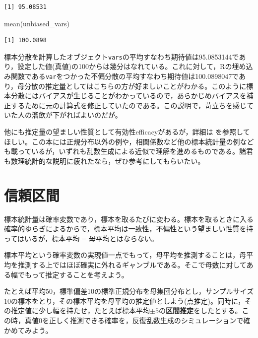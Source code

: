 \documentclass[
  a4paper,
]{ltjsbook}
\newenvironment{Shaded}{\begin{snugshade}}{\end{snugshade}}
\newcommand{\FunctionTok}[1]{\textcolor[rgb]{0.28,0.35,0.67}{#1}}
\newcommand{\NormalTok}[1]{\textcolor[rgb]{0.00,0.23,0.31}{#1}}
\begin{document}
\begin{verbatim}
[1] 95.08531
\end{verbatim}

\begin{Shaded}
\begin{Highlighting}[]
\FunctionTok{mean}\NormalTok{(unbiased\_vars)}
\end{Highlighting}
\end{Shaded}

\begin{verbatim}
[1] 100.0898
\end{verbatim}

標本分散を計算したオブジェクト\texttt{vars}の平均すなわち期待値は95.0853144であり，設定した値(真値)の100からは幾分はなれている。これに対して，Rの埋め込み関数である\texttt{var}をつかった不偏分散の平均すなわち期待値は100.0898047であり，母分散の推定量としてはこちらの方が好ましいことがわかる。このように標本分散にはバイアスが生じることがわかっているので，あらかじめバイアスを補正するために元の計算式を修正していたのである。この説明で，苛立ちを感じていた人の溜飲が下がればよいのだが。

他にも推定量の望ましい性質として有効性efficacyがあるが，詳細は
\autocite{kosugi2023}
を参照してほしい。この本には正規分布以外の例や，相関係数など他の標本統計量の例なども載っているが，いずれも乱数生成による近似で理解を進めるものである。諸君も数理統計的な説明に疲れたなら，ぜひ参考にしてもらいたい。

\section{信頼区間}\label{ux4fe1ux983cux533aux9593}

標本統計量は確率変数であり，標本を取るたびに変わる。標本を取るときに入る確率的ゆらぎによるからで，標本平均は一致性，不偏性という望ましい性質を持ってはいるが，標本平均\(=\)母平均とはならない。

標本平均という確率変数の実現値一点でもって，母平均を推測することは，母平均を推測する上ではほぼ確実に外れるギャンブルである。そこで母数に対してある幅でもって推定することを考えよう。

たとえば平均50，標準偏差10の標準正規分布を母集団分布とし，サンプルサイズ10の標本をとり，その標本平均を母平均の推定値としよう(点推定)。同時に，その推定値に少し幅を持たせ，たとえば標本平均\(\pm 5\)の\textbf{区間推定}をしたとする。この時，真値\(0\)を正しく推測できる確率を，反復乱数生成のシミュレーションで確かめてみよう。
\end{document}
